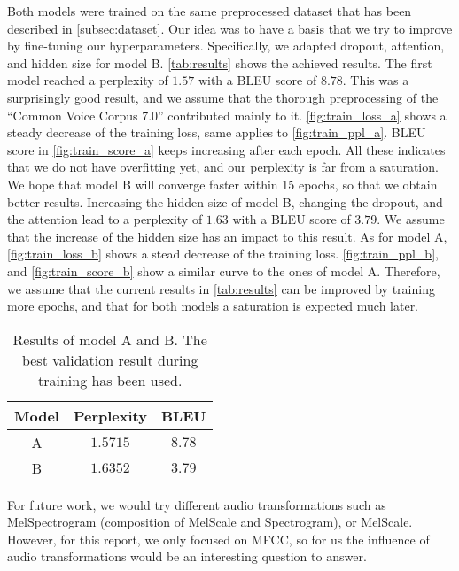 \documentclass[11pt,a4paper]{article}
\begin{document}
Both models were trained on the same preprocessed dataset that has been described in \autoref{subsec:dataset}.
Our idea was to have a basis that we try to improve by fine-tuning our hyperparameters.
Specifically, we adapted dropout, attention, and hidden size for model B. \autoref{tab:results} shows the achieved results.
The first model reached a perplexity of $1.57$ with a BLEU score of $8.78$. This was a surprisingly good result, and we assume that the thorough preprocessing of the \enquote{Common Voice Corpus 7.0} contributed mainly to it.
\autoref{fig:train_loss_a} shows a steady decrease of the  training loss, same applies to \autoref{fig:train_ppl_a}.
BLEU score in \autoref{fig:train_score_a} keeps increasing after each epoch. All these indicates that we do not have overfitting yet, and our perplexity is far from a saturation.
We hope that model B will converge faster within 15 epochs, so that we obtain better results.
Increasing the hidden size of model B, changing the dropout, and the attention lead to a perplexity of $1.63$ with a BLEU score of $3.79$.
We assume that the increase of the hidden size has an impact to this result.
As for model A, \autoref{fig:train_loss_b} shows a stead decrease of the training loss.
\autoref{fig:train_ppl_b}, and \autoref{fig:train_score_b} show a similar curve to the ones of model A.
Therefore, we assume that the current results in \autoref{tab:results} can be improved by training more epochs, and that for both models a saturation is expected much later.

\begin{table}[ht]
    \centering
    \caption{Results of model A and B. The best validation result during training has been used.}
    \begin{tabular}{c|cc}
        \textbf{Model} & \textbf{Perplexity} & \textbf{BLEU} \\
        \hline
        A     &  $1.5715$  & $8.78$ \\
        B     &  $1.6352$  & $3.79$ \\
    \end{tabular}
    \label{tab:results}
\end{table}

For future work, we would try different audio transformations such as MelSpectrogram (composition of MelScale and Spectrogram), or MelScale. However, for this report, we only focused on MFCC, so for us the influence of audio transformations would be an interesting question to answer.
\end{document}
